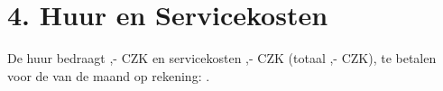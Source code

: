 \section*{4. Huur en Servicekosten}
De huur bedraagt \Rentrentamount,- CZK en servicekosten \Rentservicesamount,- CZK (totaal \Renttotalamount,- CZK), te betalen voor de \Rentpaymentday\e van de maand op rekening: \Rentbankaccount.
